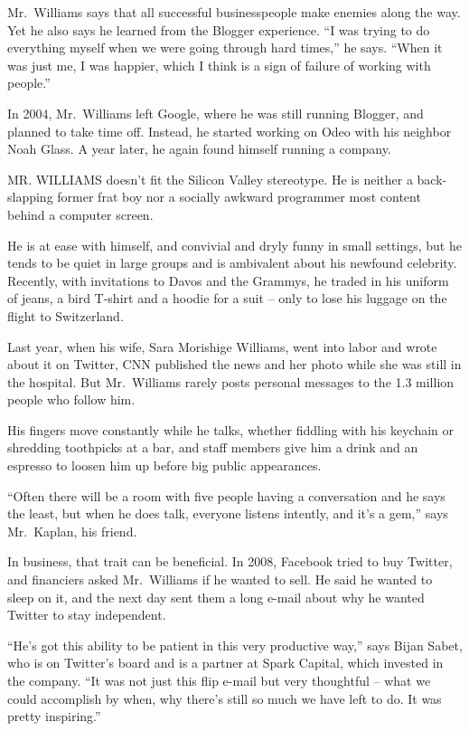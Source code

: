 ﻿\documentclass[12pt]{article}
\begin{document}
Mr.~Williams says that all successful businesspeople make enemies along the way. Yet he also says he
learned from the Blogger experience. ``I was trying to do everything myself when we were going
through hard times,'' he says. ``When it was just me, I was happier, which I think is a sign of
failure of working with people.''

In 2004, Mr.~Williams left Google, where he was still running Blogger, and planned to take time off.
Instead, he started working on Odeo with his neighbor Noah Glass. A year later, he again found
himself running a company.

MR. WILLIAMS doesn't fit the Silicon Valley stereotype. He is neither a back-slapping former frat
boy nor a socially awkward programmer most content behind a computer screen.

He is at ease with himself, and convivial and dryly funny in small settings, but he tends to be
quiet in large groups and is ambivalent about his newfound celebrity. Recently, with invitations to
Davos and the Grammys, he traded in his uniform of jeans, a bird T-shirt and a hoodie for a suit --
only to lose his luggage on the flight to Switzerland.

Last year, when his wife, Sara Morishige Williams, went into labor and wrote about it on Twitter,
CNN published the news and her photo while she was still in the hospital. But Mr.~Williams rarely
posts personal messages to the 1.3 million people who follow him.

His fingers move constantly while he talks, whether fiddling with his keychain or shredding
toothpicks at a bar, and staff members give him a drink and an espresso to loosen him up before big
public appearances.

``Often there will be a room with five people having a conversation and he says the least, but when
he does talk, everyone listens intently, and it's a gem,'' says Mr.~Kaplan, his friend.

In business, that trait can be beneficial. In 2008, Facebook tried to buy Twitter, and financiers
asked Mr.~Williams if he wanted to sell. He said he wanted to sleep on it, and the next day sent
them a long e-mail about why he wanted Twitter to stay independent.

``He's got this ability to be patient in this very productive way,'' says Bijan Sabet, who is on
Twitter's board and is a partner at Spark Capital, which invested in the company. ``It was not just
this flip e-mail but very thoughtful -- what we could accomplish by when, why there's still so much
we have left to do. It was pretty inspiring.''
\end{document}
